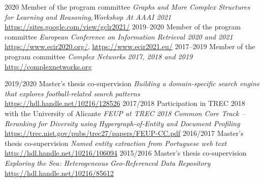 \documentclass{friggeri-cv}
\begin{document}
\begin{entrylist}
\entry
{2020}
{Member of the program committee}
{}
{\emph{Graphs and More Complex Structures for Learning and Reasoning,\newline Workshop At AAAI 2021}\\
{\small\url{https://sites.google.com/view/gclr2021/}}}
\entry
{2019--2020}
{Member of the program committee}
{}
{\emph{European Conference on Information Retrieval 2020 and 2021}\\
{\small\url{https://www.ecir2020.org/}, \url{https://www.ecir2021.eu/}}}
\entry
{2017--2019}
{Member of the program committee}
{}
{\emph{Complex Networks 2017, 2018 and 2019}\\
{\small\url{http://complexnetworks.org}}}
\end{entrylist}
\begin{entrylist}
\entry
{2019/2020}
{Master's thesis co-supervision}
{}
{\emph{Building a domain-specific search engine that explores football-related search patterns}\\
{\small\url{https://hdl.handle.net/10216/128526}}}
\entry
{2017/2018}
{Participation in TREC 2018 with the University of Alicante}
{}
{\emph{FEUP at TREC 2018 Common Core Track -- Reranking for Diversity using Hypergraph-of-Entity and Document Profiling}\\
{\small\url{https://trec.nist.gov/pubs/trec27/papers/FEUP-CC.pdf}}}
\entry
{2016/2017}
{Master's thesis co-supervision}
{}
{\emph{Named entity extraction from Portuguese web text}\\
{\small\url{http://hdl.handle.net/10216/106094}}}
\entry
{2015/2016}
{Master's thesis co-supervision}
{}
{\emph{Exploring the Sea: Heterogeneous Geo-Referenced Data Repository}\\
{\small\url{http://hdl.handle.net/10216/85612}}}
\end{entrylist}

\end{document}

